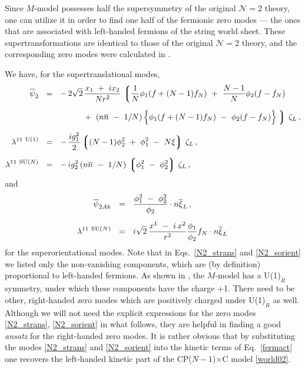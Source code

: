 \documentclass[12pt]{article}
\newcommand{\ntwo}{${\mathcal N}=2$ }
\newcommand{\wt}{\widetilde}
\newcommand{\ov}{\overline}
\newcommand{\lgr}{\left\lgroup}
\newcommand{\rgr}{\right\rgroup}
\newcommand{\nbar}{\ov{n}}
\newcommand{\CPC}{CP($N-1$)$\times$C }
\begin{document}
	Since $M$-model possesses half the supersymmetry of the original \ntwo theory, one can utilize
	it in order to find one half of the fermionic zero modes --- the ones that are associated 
	with left-handed fermions of the string world sheet.
	These supertransformations are identical to those of the original \ntwo theory, and the corresponding
	zero modes were calculated in \cite{BSYhet}.

	We have, for the supertranslational modes,
\begin{align}
\label{N2_strans}
%
\notag
\ov{\psi}_{\dot{2}}	& ~~=~~  -\,  2\sqrt{2}\, \frac{x_1 ~+~ i x_2}{N r^2} \,
		\lgr \frac{1}{N} \phi_1 ( f + (N-1) f_N ) ~+~ \frac{N-1}{N} \phi_2 ( f - f_N )  \right.
		\\[2mm]
%
\notag
%
			& \phantom{~~=~~  -\,  2\sqrt{2}}
			~+~ \left( n\nbar ~-~ 1/N \right )
			\Bigl\{ \phi_1 ( f + ( N-1 ) f_N ) ~-~ \phi_2 ( f - f_N) \Bigr\}
		\left. \rgr\, \zeta_L \,,
		\\[2mm]
%
\lambda^{11\ \rm U(1)} 	& ~~=~~ -\, \frac{i g_1^2}{2} \lgr (N-1)\phi_2^2  ~+~ \phi_1^2 ~-~ N\xi \rgr \, \zeta_L \,,
		\\[2mm]
%
\notag
\lambda^{11\ \text{SU($N$)}}	& ~~=~~ -\, {i g_2^2}\, ( n\nbar ~-~ 1/N )\, \lgr \phi_1^2 ~-~ \phi_2^2 \rgr\, \zeta_L\,,
\end{align}
	and 
\begin{align}
\label{N2_sorient}
%
\notag
\overline{\psi}_{\dot{2}Ak} & ~~=~~ \frac{\phi_1^2 ~-~ \phi_2^2}{\phi_2} \cdot n \overline{\xi}_L  \,,
 \\[2mm]
%
\lambda^{11\ \text{SU($N$)}} & ~~=~~ i \sqrt{2}\, \frac{ x^1 ~-~ i\, x^2 }{r^2} 
						  \frac{\phi_1}{\phi_2} f_N \cdot n \overline{\xi}_L \,
\end{align}
	for the superorientational modes. 
	Note that in Eqs.~\eqref{N2_strans} and \eqref{N2_sorient} we listed only the non-vanishing 
	components, which are (by definition) proportional to left-handed fermions. 
	As shown in \cite{GSYmmodel}, the $M$-model has a U(1)$_{\wt R}$ symmetry, under which these components
	have the charge +1. 
	There need to be other, right-handed zero modes which are positively charged 
	under U(1)$_{\wt R}$ as well.
	Although we will not need the explicit expressions for the 
	zero modes \eqref{N2_strans}, \eqref{N2_sorient} in what follows,
	they are helpful in finding a good {\it ansatz} for the right-handed zero modes.
	It is rather obvious that by substituting the modes \eqref{N2_strans} and \eqref{N2_sorient}
	into the kinetic terms of Eq.~\eqref{fermact} one recovers the left-handed kinetic part of the 
	\CPC model \eqref{world02}.
\end{document}
